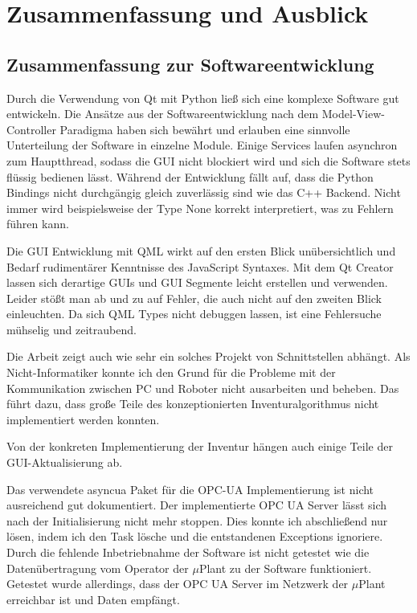 \chapter{Zusammenfassung und Ausblick}

\section{Zusammenfassung zur Softwareentwicklung}

Durch die Verwendung von Qt mit Python ließ sich eine komplexe Software gut entwickeln. 
Die Ansätze aus der Softwareentwicklung nach dem Model-View-Controller Paradigma haben sich bewährt und erlauben eine sinnvolle Unterteilung 
der Software in einzelne Module.
Einige Services laufen asynchron zum Hauptthread, sodass die GUI nicht blockiert wird und sich die Software stets flüssig bedienen lässt. 
Während der Entwicklung fällt auf, dass die Python Bindings nicht durchgängig gleich zuverlässig sind wie das C++ Backend. 
Nicht immer wird beispielsweise der Type None korrekt interpretiert, was zu Fehlern führen kann. 

Die GUI Entwicklung mit QML wirkt auf den ersten Blick unübersichtlich und Bedarf rudimentärer Kenntnisse des JavaScript Syntaxes. 
Mit dem Qt Creator lassen sich derartige GUIs und GUI Segmente leicht erstellen und verwenden. 
Leider stößt man ab und zu auf Fehler, die auch nicht auf den zweiten Blick einleuchten. 
Da sich QML Types nicht debuggen lassen, ist eine Fehlersuche mühselig und zeitraubend.

Die Arbeit zeigt auch wie sehr ein solches Projekt von Schnittstellen abhängt. 
Als Nicht-Informatiker konnte ich den Grund für die Probleme mit der Kommunikation zwischen PC und Roboter nicht ausarbeiten und beheben. 
Das führt dazu, dass große Teile des konzeptionierten Inventuralgorithmus nicht implementiert werden konnten. 

Von der konkreten Implementierung der Inventur hängen auch einige Teile der GUI-Aktualisierung ab. 


Das verwendete asyncua Paket für die OPC-UA Implementierung ist nicht ausreichend gut dokumentiert.
Der implementierte OPC UA Server lässt sich nach der Initialisierung nicht mehr stoppen.
Dies konnte ich abschließend nur lösen, indem ich den Task lösche und die entstandenen Exceptions ignoriere. 
Durch die fehlende Inbetriebnahme der Software ist nicht getestet wie die Datenübertragung vom Operator der $\mu$Plant zu der Software funktioniert.
Getestet wurde allerdings, dass der OPC UA Server im Netzwerk der $\mu$Plant erreichbar ist und Daten empfängt.

